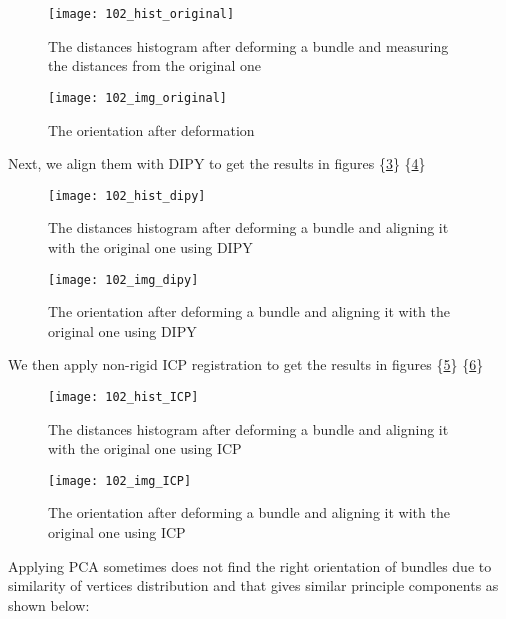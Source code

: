 \documentclass[../structure.tex]{subfiles}
\begin{document}
\begin{figure}[h!]
\centering
\texttt{[image: 102\_hist\_original]}
\captionsetup{justification=centering}
\caption{The distances histogram after deforming a bundle and measuring the distances from the original one}
\label{fig:hist_original_def}
\end{figure}

\begin{figure}[h!]
\centering
\texttt{[image: 102\_img\_original]}
\captionsetup{justification=centering}
\caption{The orientation after deformation}
\label{fig:img_original_def}
\end{figure}
\pagebreak

Next, we align them with DIPY to get the results in figures \{\ref{fig:hist_dipy_def}\} \{\ref{fig:img_dipy_def}\}

\begin{figure}[h!]
\centering
\texttt{[image: 102\_hist\_dipy]}
\captionsetup{justification=centering}
\caption{The distances histogram after deforming a bundle and aligning it with the original one using DIPY}
\label{fig:hist_dipy_def}
\end{figure}

\begin{figure}[h!]
\centering
\texttt{[image: 102\_img\_dipy]}
\captionsetup{justification=centering}
\caption{The orientation after deforming a bundle and aligning it with the original one using DIPY}
\label{fig:img_dipy_def}
\end{figure}
\pagebreak
We then apply non-rigid ICP registration to get the results in figures \{\ref{fig:hist_icp_def}\} \{\ref{fig:img_icp_def}\}

\begin{figure}[h!]
\centering
\texttt{[image: 102\_hist\_ICP]}
\captionsetup{justification=centering}
\caption{The distances histogram after deforming a bundle and aligning it with the original one using ICP}
\label{fig:hist_icp_def}
\end{figure}

\begin{figure}[h!]
\centering
\texttt{[image: 102\_img\_ICP]}
\captionsetup{justification=centering}
\caption{The orientation after deforming a bundle and aligning it with the original one using ICP}
\label{fig:img_icp_def}
\end{figure}

\pagebreak

Applying PCA sometimes does not find the right orientation of bundles due to similarity of vertices distribution and that gives similar principle components as shown below:
\end{document}
